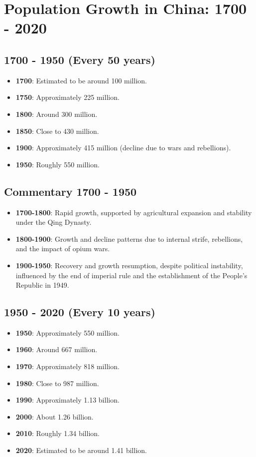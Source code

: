 \section*{Population Growth in China: 1700 - 2020}

\subsection*{1700 - 1950 (Every 50 years)}
\begin{itemize}
    \item \textbf{1700}: Estimated to be around 100 million.
    \item \textbf{1750}: Approximately 225 million.
    \item \textbf{1800}: Around 300 million.
    \item \textbf{1850}: Close to 430 million.
    \item \textbf{1900}: Approximately 415 million (decline due to wars and rebellions).
    \item \textbf{1950}: Roughly 550 million.
\end{itemize}

\subsection*{Commentary 1700 - 1950}
\begin{itemize}
    \item \textbf{1700-1800}: Rapid growth, supported by agricultural expansion and stability under the Qing Dynasty.
    \item \textbf{1800-1900}: Growth and decline patterns due to internal strife, rebellions, and the impact of opium wars.
    \item \textbf{1900-1950}: Recovery and growth resumption, despite political instability, influenced by the end of imperial rule and the establishment of the People’s Republic in 1949.
\end{itemize}

\subsection*{1950 - 2020 (Every 10 years)}
\begin{itemize}
    \item \textbf{1950}: Approximately 550 million.
    \item \textbf{1960}: Around 667 million.
    \item \textbf{1970}: Approximately 818 million.
    \item \textbf{1980}: Close to 987 million.
    \item \textbf{1990}: Approximately 1.13 billion.
    \item \textbf{2000}: About 1.26 billion.
    \item \textbf{2010}: Roughly 1.34 billion.
    \item \textbf{2020}: Estimated to be around 1.41 billion.
\end{itemize}

